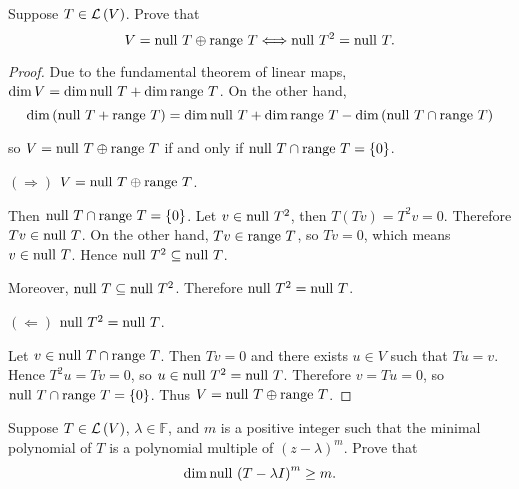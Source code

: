 \begin{exercise}\label{chapter8:sectionA:exercise3}
    Suppose $T\in\mathcal{L}\left({V}\right)$. Prove that
    \[
        V = \operatorname{null}\,{T}\oplus\operatorname{range}\,{T} \Longleftrightarrow \operatorname{null}\,{T}^{2} = \operatorname{null}\,{T}.
    \]
\end{exercise}

\begin{proof}
    Due to the fundamental theorem of linear maps, $\dim V = \dim\operatorname{null}\,{T} + \dim\operatorname{range}\,{T}$. On the other hand,
    \[
        \dim{(\operatorname{null}\,{T} + \operatorname{range}\,{T})} = \dim\operatorname{null}\,{T} + \dim\operatorname{range}\,{T} - \dim{(\operatorname{null}\,{T} \cap \operatorname{range}\,{T})}
    \]

    so $V = \operatorname{null}\,{T}\oplus\operatorname{range}\,{T}$ if and only if $\operatorname{null}\,{T} \cap \operatorname{range}\,{T} = \{0\}$.

    \bigskip
    $(\Rightarrow)$ $V = \operatorname{null}\,{T}\oplus \operatorname{range}\,{T}$.

    Then $\operatorname{null}\,{T}\cap \operatorname{range}\,{T} = \{0\}$. Let $v\in\operatorname{null}\,{T^{2}}$, then $T(Tv) = T^{2}v = 0$. Therefore $Tv\in\operatorname{null}\,{T}$. On the other hand, $Tv\in\operatorname{range}\,{T}$, so $Tv = 0$, which means $v\in\operatorname{null}\,{T}$. Hence $\operatorname{null}\,{T^{2}}\subseteq\operatorname{null}\,{T}$.

    Moreover, $\operatorname{null}\,{T}\subseteq\operatorname{null}\,{T^{2}}$. Therefore $\operatorname{null}\,{T^{2}} = \operatorname{null}\,{T}$.

    \bigskip
    $(\Leftarrow)$ $\operatorname{null}\,{T^{2}} = \operatorname{null}\,{T}$.

    Let $v\in \operatorname{null}\,{T}\cap\operatorname{range}\,{T}$. Then $Tv = 0$ and there exists $u\in V$ such that $Tu = v$. Hence $T^{2}u = Tv = 0$, so $u\in\operatorname{null}\,{T^{2}} = \operatorname{null}\,{T}$. Therefore $v = Tu = 0$, so $\operatorname{null}\,{T}\cap\operatorname{range}\,{T} = \{0\}$. Thus $V = \operatorname{null}\,{T}\oplus\operatorname{range}\,{T}$.
\end{proof}
\newpage

\begin{exercise}\label{chapter8:sectionA:exercise4}
    Suppose $T\in\mathcal{L}\left({V}\right)$, $\lambda\in\mathbb{F}$, and $m$ is a positive integer such that the minimal polynomial of $T$ is a polynomial multiple of ${(z - \lambda)}^{m}$. Prove that
    \[
        \dim\operatorname{null}\,{{(T - \lambda I)}^{m}} \geq m.
    \]
\end{exercise}

